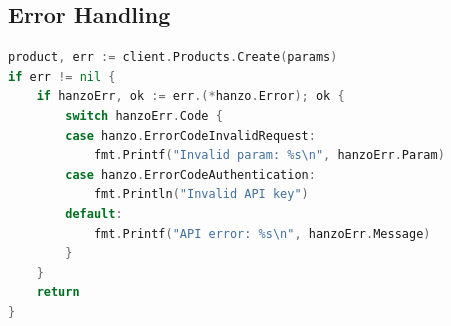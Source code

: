 \subsection{Error Handling}

\begin{lstlisting}[language=Go, caption=Go Error Handling]
product, err := client.Products.Create(params)
if err != nil {
    if hanzoErr, ok := err.(*hanzo.Error); ok {
        switch hanzoErr.Code {
        case hanzo.ErrorCodeInvalidRequest:
            fmt.Printf("Invalid param: %s\n", hanzoErr.Param)
        case hanzo.ErrorCodeAuthentication:
            fmt.Println("Invalid API key")
        default:
            fmt.Printf("API error: %s\n", hanzoErr.Message)
        }
    }
    return
}
\end{lstlisting}

